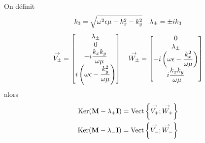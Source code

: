     \begin{prop}
        On définit
        \begin{equation}
            k_3=\sqrt{\omega^2\epsilon\mu - k_x^2 -k_y^2} \quad \lambda_\pm=\pm i k_3
        \end{equation}
        \begin{equation}
            {\overset{\rightarrow}{V_\pm}} =
            \begin{bmatrix}
            \lambda_\pm \\
                0 \\
                -i\dfrac{k_xk_y}{\omega\mu} \\
                i\left(\omega\epsilon - \dfrac{k_y^2}{\omega\mu}\right) \\
            \end{bmatrix}
            \quad
            {\overset{\rightarrow}{W_\pm}} =
                \begin{bmatrix}
                0 \\
                \lambda_\pm \\
                -i\left(\omega\epsilon - \dfrac{k_x^2}{\omega\mu}\right) \\
                i\dfrac{k_xk_y}{\omega\mu} \\
            \end{bmatrix}
        \end{equation}
        alors
        \begin{subequations}
            \begin{align}
                \operatorname{Ker}(\mathbf{M}-\lambda_+\mathbf{I})=\operatorname{Vect}\left\lbrace{\overset{\rightarrow}{V_+}};{\overset{\rightarrow}{W_+}}\right\rbrace\\
                \operatorname{Ker}(\mathbf{M}-\lambda_-\mathbf{I})=\operatorname{Vect}\left\lbrace{\overset{\rightarrow}{V_-}};{\overset{\rightarrow}{W_-}}\right\rbrace
            \end{align}
        \end{subequations}
    \end{prop}

